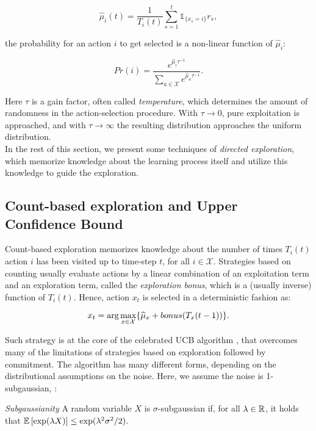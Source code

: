 \begin{equation}
\hat{\mu}_i(t) = \frac{1}{T_i(t)}\sum_{s=1}^{t}\mathds{1}_{\{x_s=i\}}r_s,
\end{equation}

the probability for an action $i$ to get selected is a non-linear function of $\hat{\mu}_i$:

\begin{equation}
Pr(i) = \frac{e^{\hat{\mu}_i \tau^{-1}}}{\sum_{a\in\mathcal{X}}e^{\hat{\mu}_{a}\tau^{-1}}}.
\end{equation}

Here $\tau$ is a gain factor, often called \emph{temperature}, which determines the amount of randomness in the action-selection procedure. With $\tau\to 0$, pure exploitation is approached, and with $\tau\to \infty$ the resulting distribution approaches the uniform distribution. \\
In the rest of this section, we present some techniques of \emph{directed exploration}, which memorize knowledge about the learning process itself and utilize this knowledge to guide the exploration.

\subsection{Count-based exploration and Upper Confidence Bound} \label{sebsec:count&UCB}
Count-based exploration memorizes knowledge about the number of times $T_i(t)$ action $i$ has been visited up to time-step $t$, for all $i\in\mathcal{X}$. Strategies based on counting usually evaluate actions by a linear combination of an exploitation term and an exploration term, called the \emph{exploration bonus}, which is a (usually inverse) function of $T_i(t)$. Hence, action $x_t$ is selected in a deterministic fashion as:

\begin{equation}
x_t = \arg\max_{x\in\mathcal{X}}\{\widehat{\mu}_x + bonus(T_x(t-1))\}.
\end{equation}

Such strategy is at the core of the celebrated \gls{UCB} algorithm \cite{lai1985asymptotically, agrawal1995continuum, auer2002finite}, that overcomes many of the limitations of strategies based on exploration followed by commitment. The algorithm has many different forms, depending on the distributional assumptions on the noise. Here, we assume the noise is 1-subgaussian, \ie :

\begin{definition} \label{def:subgaussianity}
\emph{Subgaussianity} A random variable $X$ is $\sigma$-subgaussian if, for all $\lambda\in\mathbb{R}$, it holds that $\mathop{\mathbb{E}\left[{\exp(\lambda X)}\right]}\leq\exp(\lambda^2\sigma^2/2)$.
\end{definition}

